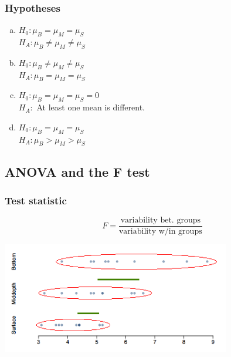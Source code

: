 
\begin{frame}
\frametitle{Hypotheses}


\begin{enumerate}[(a)]
\item $H_0: \mu_B = \mu_M = \mu_S$ \\
$H_A: \mu_B \ne \mu_M \ne \mu_S$ \\
\item $H_0: \mu_B \ne \mu_ M \ne \mu_S$ \\
$H_A: \mu_B = \mu_M = \mu_S$ \\
\item $H_0: \mu_B = \mu_M = \mu_S = 0$ \\
$H_A:$ At least one mean is different.
\item $H_0: \mu_B = \mu_M = \mu_S$ \\
$H_A: \mu_B > \mu_M > \mu_S$ \\
\end{enumerate}

\end{frame}


\subsection{ANOVA and the F test}


\begin{frame}
\frametitle{Test statistic}


\[ F = \frac{\text{variability bet. groups}}{\text{variability w/in groups}}  \]

\begin{center}
\includegraphics[width=0.75\textwidth]{7-5_anova/figures/aldrin/dotplot_var}
\end{center}

\end{frame}

